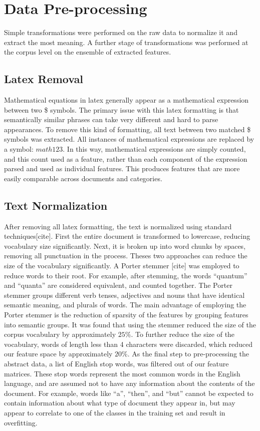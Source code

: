 \documentclass[10pt,twocolumn]{article}
\begin{document}
\section*{Data Pre-processing}

Simple transformations were performed on the raw data to normalize it and extract the most meaning. A further stage of transformations was performed at the corpus level on the ensemble of extracted features.

\subsection*{Latex Removal}

Mathematical equations in latex generally appear as a mathematical expression between two \$ symbols. The primary issue with this latex formatting is that semantically similar phrases can take very different and hard to parse appearances. To remove this kind of formatting, all text between two matched \$ symbols was extracted. All instances of mathematical expressions are replaced by a symbol: $math123$. In this way, mathematical expressions are simply counted, and this count used as a feature, rather than each component of the expression parsed and used as individual features.  This produces features that are more easily comparable across documents and categories.

\subsection*{Text Normalization}

After removing all latex formatting, the text is normalized using standard techniques[cite]. First the entire document is transformed to lowercase, reducing vocabulary size significantly. Next, it is broken up into word chunks by spaces, removing all punctuation in the process. Theses two approaches can reduce the size of the vocabulary significantly. A Porter stemmer [cite] was employed to reduce words to their root.  For example, after stemming, the words ``quantum'' and ``quanta'' are considered equivalent, and counted together. The Porter stemmer groups different verb tenses, adjectives and nouns that have identical semantic meaning, and plurals of words.  The main advantage of employing the Porter stemmer is the reduction of sparsity of the features by grouping features into semantic groups.  It was found that using the stemmer reduced the size of the corpus vocabulary by approximately $25\%$.  To further reduce the size of the vocabulary, words of length less than 4 characters were discarded, which reduced our feature space by approximately $20\%$.  As the final step to pre-processing the abstract data, a list of English stop words, was filtered out of our feature matrices.  These stop words represent the most common words in the English language, and are assumed not to have any information about the contents of the document.  For example, words like ``a'', ``then'', and ``but'' cannot be expected to contain information about what type of document they appear in, but may appear to correlate to one of the classes in the training set and result in overfitting.
\end{document}
